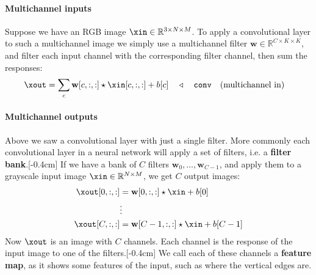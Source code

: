\paragraph*{Multichannel inputs}

Suppose we have an RGB image $\xin \in \mathbb{R}^{3 \times N \times M}$. To apply a convolutional layer to such a multichannel image we simply use a multichannel filter $\mathbf{w} \in \mathbb{R}^{C \times K \times K}$, and filter each input channel with the corresponding filter channel, then sum the responses:
\begin{align}
    \xout = \sum_{c} \mathbf{w}[c,:,:] \star \xin[c,:,:] + b[c] & \quad \triangleleft \quad\texttt{conv}\quad \text{(multichannel in)}
\end{align}

\paragraph*{Multichannel outputs}
Above we saw a convolutional layer with just a single filter. More commonly each convolutional layer in a neural network will apply a set of filters, i.e. a \textbf{filter bank}.[-0.4cm] If we have a bank of $C$ filters $\mathbf{w}_0, \ldots, \mathbf{w}_{C-1}$, and apply them to a grayscale input image $\xin \in \mathbb{R}^{N \times M}$, we get $C$ output images:
\begin{align}
    \xout[0,:,:] &= \mathbf{w}[0,:,:] \star \xin + b[0]\\
    &\vdots \nonumber\\
    \xout[C,:,:] &= \mathbf{w}[C-1,:,:] \star \xin + b[C-1]
\label{eqn:convolutional_neural_nets:convolutional_layer_filter_bank}
\end{align}
Now $\xout$ is an image with $C$ channels. Each channel is the response of the input image to one of the filters.[-0.4cm] We call each of these channels a \textbf{feature map}, as it shows some features of the input, such as where the vertical edges are. 

